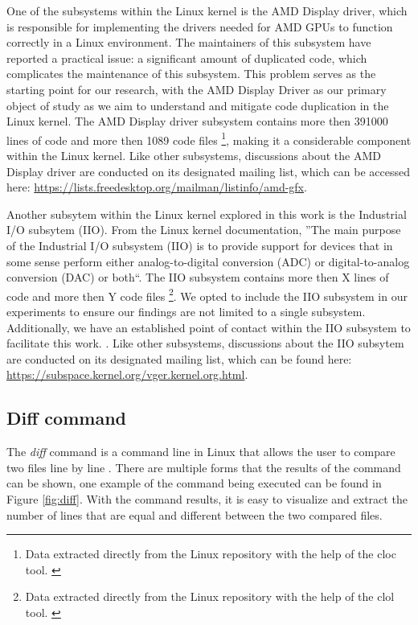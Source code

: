 One of the subsystems within the Linux kernel is the AMD Display driver, which
is responsible for implementing the drivers needed for AMD GPUs to function
correctly in a Linux environment. The maintainers of this subsystem have
reported a practical issue: a significant amount of duplicated code, which
complicates the maintenance of this subsystem. This problem serves as the
starting point for our research, with the AMD Display Driver as our primary
object of study as we aim to understand and mitigate code duplication in the
Linux kernel. The AMD Display driver subsystem contains more then 391000 lines 
of code and more then 1089 code files
\footnote{ 
Data extracted directly from the Linux repository with the help of the cloc tool.
\citep{cloc}
}, 
making it a considerable component within the Linux kernel. Like other 
subsystems, discussions about the AMD Display driver are conducted on its 
designated mailing list, which can be accessed here: 
\url{https://lists.freedesktop.org/mailman/listinfo/amd-gfx}.

Another subsytem within the Linux kernel explored in this work is the Industrial
I/O subsytem (IIO). From the Linux kernel documentation, ''The main purpose of the 
Industrial I/O subsystem (IIO) is to provide support for devices that in some sense 
perform either analog-to-digital conversion (ADC) or digital-to-analog conversion (DAC) or both``\citep{iiodoc}.
The IIO subsystem contains more then X lines of code and more then Y code files 
\footnote{
Data extracted directly from the Linux repository with the help of the clol tool. \citep{cloc}
}.
We opted to include the IIO subsystem in our experiments to ensure our findings are not limited to a single subsystem. 
Additionally, we have an established point of contact within the IIO subsystem to facilitate this work.
. Like other subsystems, discussions about the IIO subsytem are conducted on its 
designated mailing list, which can be found here: 
\url{https://subspace.kernel.org/vger.kernel.org.html}.


\subsection{Diff command}

The \textit{diff} command is a command line in Linux that allows the user to compare 
two files line by line \citep{diffcommand}. There are multiple forms 
that the results of the command can be shown, one example of the command being executed 
can be found in Figure \ref{fig:diff}. With the command results, it is easy to visualize and extract 
the number of lines that are equal and different between the two compared files.


